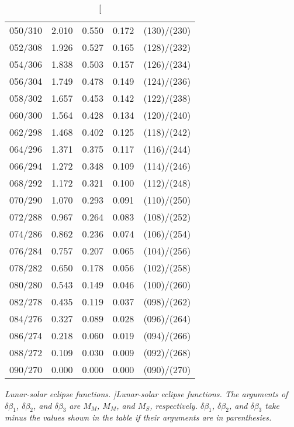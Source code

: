 \begin{table}
{\begin{tabular}{rrrrc}
050/310 &  2.010 &  0.550 &  0.172 & (130)/(230)\\
052/308 &  1.926 &  0.527 &  0.165 & (128)/(232)\\
054/306 &  1.838 &  0.503 &  0.157 & (126)/(234)\\
056/304 &  1.749 &  0.478 &  0.149 & (124)/(236)\\
058/302 &  1.657 &  0.453 &  0.142 & (122)/(238)\\
060/300 &  1.564 &  0.428 &  0.134 & (120)/(240)\\
062/298 &  1.468 &  0.402 &  0.125 & (118)/(242)\\
064/296 &  1.371 &  0.375 &  0.117 & (116)/(244)\\
066/294 &  1.272 &  0.348 &  0.109 & (114)/(246)\\
068/292 &  1.172 &  0.321 &  0.100 & (112)/(248)\\
070/290 &  1.070 &  0.293 &  0.091 & (110)/(250)\\
072/288 &  0.967 &  0.264 &  0.083 & (108)/(252)\\
074/286 &  0.862 &  0.236 &  0.074 & (106)/(254)\\
076/284 &  0.757 &  0.207 &  0.065 & (104)/(256)\\
078/282 &  0.650 &  0.178 &  0.056 & (102)/(258)\\
080/280 &  0.543 &  0.149 &  0.046 & (100)/(260)\\
082/278 &  0.435 &  0.119 &  0.037 & (098)/(262)\\
084/276 &  0.327 &  0.089 &  0.028 & (096)/(264)\\
086/274 &  0.218 &  0.060 &  0.019 & (094)/(266)\\
088/272 &  0.109 &  0.030 &  0.009 & (092)/(268)\\
090/270 &  0.000 &  0.000 &  0.000 & (090)/(270)\\
\end{tabular}}
\caption[\em  Lunar-solar eclipse functions. ]{\em Lunar-solar eclipse functions. The  arguments of $\delta\beta_1$, $\delta\beta_2$, and $\delta\beta_3$ are $M_M$, $M_M$, and $M_S$, respectively.  $\delta\beta_1$, $\delta\beta_2$, and  $\delta\beta_3$ take minus the values shown
in the table if their arguments are
in parenthesies. }\label{tsyzb}
\end{table}


